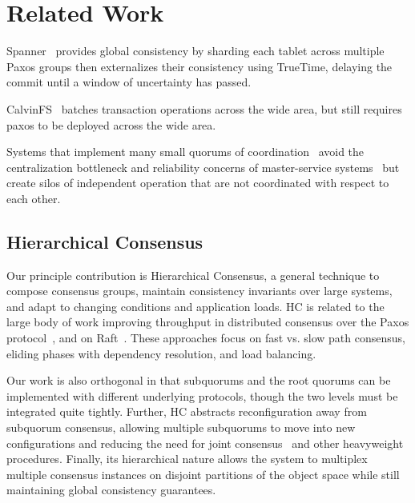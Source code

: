 
\renewcommand{\thechapter}{7}

\chapter{Related Work}
\label{ch:related_work}

Spanner~\cite{spanner} provides global consistency by sharding each tablet across multiple Paxos groups then externalizes their consistency using TrueTime, delaying the commit until a window of uncertainty has passed.

CalvinFS~\cite{calvindb,calvinfs} batches transaction operations across the wide area, but still requires paxos to be deployed across the wide area.

Systems that implement many small quorums of
coordination~\cite{mdcc,scatter,spanner} avoid the centralization bottleneck
and reliability concerns of master-service
systems~\cite{gray_dangers_1996,gfs} but create silos of independent
operation that are not coordinated with respect to each other.

\section{Hierarchical Consensus}

Our principle contribution is Hierarchical Consensus, a general technique to compose consensus groups, maintain consistency invariants over large systems, and adapt to changing conditions and application loads.
HC is related to the large body of work improving throughput in distributed consensus over the Paxos protocol~\cite{paxos,epaxos,fexible_paxos,generalized_paxos}, and on Raft~\cite{raft,raft_refloated}.
These approaches focus on fast vs. slow path consensus, eliding phases with dependency resolution, and load balancing.

Our work is also orthogonal in that subquorums and the root quorums can be implemented with different underlying protocols, though the two levels must be integrated quite tightly.
Further, HC abstracts reconfiguration away from subquorum consensus, allowing multiple subquorums to move into new configurations and reducing the need for joint consensus~\cite{raft} and other heavyweight procedures.
Finally, its hierarchical nature allows the system to multiplex multiple consensus instances on disjoint partitions of the object space while still maintaining global consistency guarantees.

